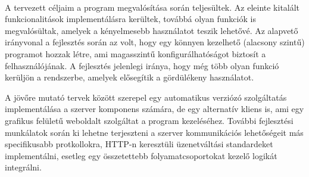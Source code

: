 \documentclass[12pt]{report}
\begin{document}
\paragraph{}
A tervezett céljaim a program megvalósítása során teljesültek. Az eleinte kitalált funkcionalitások implementálásra kerültek, továbbá olyan funkciók is megvalósültak, amelyek a kényelmesebb használatot teszik lehetővé.
Az alapvető irányvonal a fejlesztés során az volt, hogy egy könnyen kezelhető (alacsony szintű) programot hozzak létre, ami magasszintű konfigurálhatóságot biztosít a felhasználójának.
A fejlesztés jelenlegi iránya, hogy még több olyan funkció kerüljön a rendszerbe, amelyek elősegítik a gördülékeny használatot. 

A jövőre mutató tervek között szerepel egy  automatikus verziózó szolgáltatás implementálása a szerver komponens számára, de egy alternatív kliens is, ami egy grafikus felületű weboldalt szolgáltat a program kezeléséhez.
További fejlesztési munkálatok során ki lehetne terjeszteni a szerver kommunikációs lehetőségeit más specifikusabb protkollokra, HTTP-n keresztüli üzenetváltási standardeket implementálni, esetleg egy összetettebb folyamatcsoportokat kezelő logikát integrálni.
\end{document}
